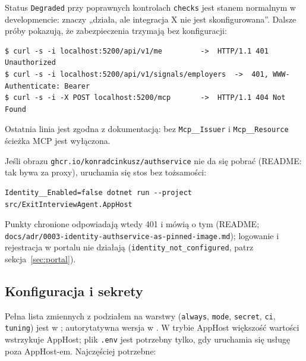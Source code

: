 {Status \texttt{Degraded} przy poprawnych kontrolach \texttt{checks} jest stanem
normalnym w developmencie: znaczy „działa, ale integracja X nie jest
skonfigurowana”. Dalsze próby pokazują, że zabezpieczenia trzymają bez
konfiguracji:

\begin{Verbatim}[fontsize=\scriptsize,frame=single,framesep=2mm]
$ curl -s -i localhost:5200/api/v1/me         ->  HTTP/1.1 401 Unauthorized
$ curl -s -i localhost:5200/api/v1/signals/employers  ->  401, WWW-Authenticate: Bearer
$ curl -s -i -X POST localhost:5200/mcp       ->  HTTP/1.1 404 Not Found
\end{Verbatim}

Ostatnia linia jest zgodna z dokumentacją: bez \texttt{Mcp\_\_Issuer} i
\texttt{Mcp\_\_Resource} ścieżka MCP jest wyłączona.

Jeśli obrazu \texttt{ghcr.\allowbreak{}io/\allowbreak{}konradcinkusz/\allowbreak{}authservice} nie da się pobrać
(README: tak bywa za proxy), uruchamia się stos bez tożsamości:

\begin{Verbatim}[fontsize=\scriptsize,frame=single,framesep=2mm]
Identity__Enabled=false dotnet run --project src/ExitInterviewAgent.AppHost
\end{Verbatim}

Punkty chronione odpowiadają wtedy 401 i mówią o tym (README;
\texttt{docs/\allowbreak{}adr/\allowbreak{}0003-\allowbreak{}identity-\allowbreak{}authservice-\allowbreak{}as-\allowbreak{}pinned-\allowbreak{}image.\allowbreak{}md}); logowanie i
rejestracja w portalu nie działają
(\texttt{identity\_\allowbreak{}not\_\allowbreak{}configured}, patrz sekcja~\ref{sec:portal}).

\subsection{Konfiguracja i sekrety}

Pełna lista zmiennych z podziałem na warstwy (\texttt{always}, \texttt{mode},
\texttt{secret}, \texttt{ci}, \texttt{tuning}) jest w
; autorytatywna wersja w
. W trybie AppHost większość wartości wstrzykuje
AppHost; plik \texttt{.env} jest potrzebny tylko, gdy uruchamia się usługę poza
AppHost-em. Najczęściej potrzebne:

}
